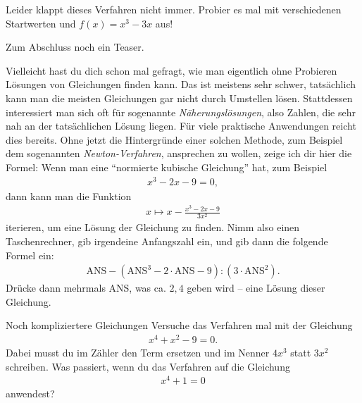 \documentclass[a4paper,ngerman,12pt]{zirkelblatt1415}
\theoremstyle{definition}
\theoremstyle{remark}
\begin{document}
Leider klappt dieses Verfahren nicht immer.
Probier es mal mit verschiedenen Startwerten und $f(x) =  x^3 - 3x$ aus!

Zum Abschluss noch ein Teaser.

Vielleicht hast du dich schon mal gefragt, wie man eigentlich ohne Probieren Lösungen von Gleichungen finden kann. Das ist meistens sehr schwer, tatsächlich kann man die meisten Gleichungen gar nicht durch Umstellen lösen. Stattdessen interessiert man sich oft für sogenannte \emph{Näherungslösungen}, also Zahlen, die sehr nah an der tatsächlichen Lösung liegen. Für viele praktische Anwendungen reicht dies bereits. Ohne jetzt die Hintergründe einer solchen Methode, zum Beispiel dem sogenannten \emph{Newton-Verfahren}, ansprechen zu wollen, zeige ich dir hier die Formel:
Wenn man eine "`normierte kubische Gleichung"' hat, zum Beispiel 
\begin{align*}
 x^3 - 2x - 9 = 0,
\end{align*}
dann kann man die Funktion 
\begin{align*}
 x \mapsto x - \frac{x^3-2x-9}{3x^2}
\end{align*}
iterieren, um eine Lösung der Gleichung zu finden.
Nimm also einen Taschenrechner, gib irgendeine Anfangszahl ein, und gib dann die folgende Formel ein:
\begin{align*}
 \text{ANS} - (\text{ANS}^3 - 2 \cdot \text{ANS} -9) : (3 \cdot \text{ANS}^2). 
\end{align*}
Drücke dann mehrmals ANS, was ca. $2,4$ geben wird -- eine Lösung dieser Gleichung.

\begin{aufgabe}{Noch kompliziertere Gleichungen}
 Versuche das Verfahren mal mit der Gleichung 
 \begin{align*}
  x^4 + x^2 - 9 = 0.
 \end{align*}
 Dabei musst du im Zähler den Term ersetzen und im Nenner $4x^3$ statt $3x^2$ schreiben.
 Was passiert, wenn du das Verfahren auf die Gleichung 
 \begin{align*}
  x^4 + 1 = 0
 \end{align*}
anwendest?
\end{aufgabe}
\end{document}
